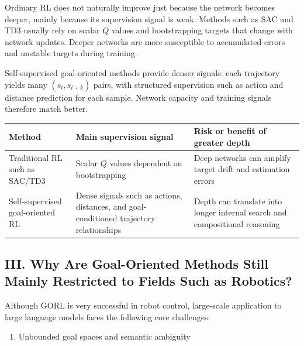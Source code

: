 Ordinary RL does not naturally improve just because the network becomes deeper, mainly because its supervision signal is weak. Methods such as SAC and TD3 usually rely on scalar \(Q\) values and bootstrapping targets that change with network updates. Deeper networks are more susceptible to accumulated errors and unstable targets during training.

Self-supervised goal-oriented methods provide denser signals: each trajectory yields many \((s_t,s_{t+k})\) pairs, with structured supervision such as action and distance prediction for each sample. Network capacity and training signals therefore match better.

\begin{longtable}[]{@{}
  >{\raggedright\arraybackslash}p{}
  >{\raggedright\arraybackslash}p{}
  >{\raggedright\arraybackslash}p{}@{}}
\toprule
Method & Main supervision signal & Risk or benefit of greater depth \\
\midrule
\endhead
Traditional RL such as SAC/TD3 & Scalar \(Q\) values dependent on bootstrapping & Deep networks can amplify target drift and estimation errors \\
Self-supervised goal-oriented RL & Dense signals such as actions, distances, and goal-conditioned trajectory relationships & Depth can translate into longer internal search and compositional reasoning \\
\bottomrule
\end{longtable}

\hypertarget{iii.-why-are-goal-oriented-methods-still-mainly-restricted-to-fields-such-as-robotics}{%
\subsection{III. Why Are Goal-Oriented Methods Still Mainly Restricted to Fields Such as Robotics?}\label{iii.-why-are-goal-oriented-methods-still-mainly-restricted-to-fields-such-as-robotics}}

Although GORL is very successful in robot control, large-scale application to large language models faces the following core challenges:

\begin{enumerate}
\def\labelenumi{\arabic{enumi}.}
\tightlist
\item
  Unbounded goal spaces and semantic ambiguity
\end{enumerate}

